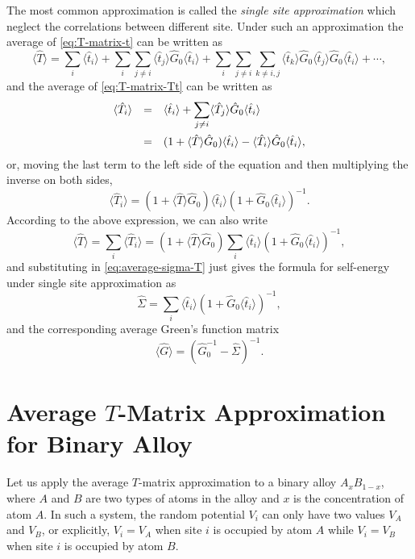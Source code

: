 \documentclass{book}
\newcommand{\average}[1]{\langle#1\rangle}
\numberwithin{equation}{section}
\begin{document}
The most common approximation is called the \textit{single site
  approximation} which neglect the correlations between different
site. Under such an approximation the average of \eqref{eq:T-matrix-t}
can be written as
\begin{equation}
  \average{\hat{T}}=\sum_i\average{\hat{t}_i}+
  \sum_i\sum_{j\ne i}\average{\hat{t}_j}\hat{G}_0\average{\hat{t}_i}
  +\sum_i\sum_{j\ne i}\sum_{k\ne i,j}\average{\hat{t}_k}
  \hat{G}_0\average{\hat{t}_j}\hat{G}_0\average{\hat{t}_i}+\cdots,
\end{equation}
and the average of \eqref{eq:T-matrix-Tt} can be written as
\begin{equation}
  \begin{array}{rcl}
    \average{\hat{T}_i}&=&\displaystyle\average{\hat{t}_i}+\sum_{j\ne i}
    \average{\hat{T}_j}\hat{G}_0\average{\hat{t}_i}\\\vbox to 14pt{}
    &=&(1+\average{\hat{T}}\hat{G}_0)\average{\hat{t}_i}-
    \average{\hat{T}_i}\hat{G}_0\average{\hat{t}_i},
  \end{array}
\end{equation} 
or, moving the last term to the left side of the equation and then
multiplying the inverse on both sides,
\begin{equation}
  \average{\hat{T}_i}=(1+\average{\hat{T}}\hat{G}_0)
  \average{\hat{t}_i}(1+\hat{G}_0\average{\hat{t}_i})^{-1}.
\end{equation}
According to the above expression, we can also write 
\begin{equation}
  \label{eq:T-matrix-average}
  \average{\hat{T}}=\sum_i\average{\hat{T}_i}=
  (1+\average{\hat{T}}\hat{G}_0)\sum_i\average{\hat{t}_i}
  (1+\hat{G}_0\average{\hat{t}_i})^{-1},
\end{equation}
and substituting in \eqref{eq:average-sigma-T} just gives the formula
for self-energy under single site approximation as
\begin{equation}
  \label{eq:average-sigma-t}
  \hat{\Sigma}=\sum_{i}\average{\hat{t}_i}(1+\hat{G}_0\average{\hat{t}_i})^{-1},
\end{equation}
and the corresponding average Green's function matrix
\begin{equation}
  \average{\hat{G}}=(\hat{G}_0^{-1}-\hat{\Sigma})^{-1}.
\end{equation}

\section{Average $T$-Matrix Approximation for Binary Alloy}
Let us apply the average $T$-matrix approximation to a binary alloy
$A_xB_{1-x}$, where $A$ and $B$ are two types of atoms in the alloy
and $x$ is the concentration of atom $A$. In such a system, the random
potential $V_i$ can only have two values $V_A$ and $V_B$, or
explicitly, $V_i=V_A$ when site $i$ is occupied by atom $A$ while
$V_i=V_B$ when site $i$ is occupied by atom $B$.
\end{document}
